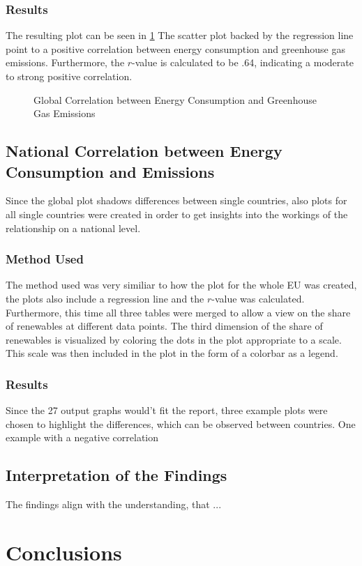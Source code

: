 \documentclass{article}
\begin{document}
\subsubsection*{Results}
The resulting plot can be seen in \cref{plt:global_consumption_vs_emissions}
The scatter plot backed by the regression line point to a positive correlation between energy consumption and greenhouse gas emissions.
Furthermore, the $r$-value is calculated to be .64, indicating a moderate to strong positive correlation.

\begin{figure}
    \centering
    \resizebox{\textwidth}{!}{}
    \caption{Global Correlation between Energy Consumption and Greenhouse Gas Emissions}
    \label{plt:global_consumption_vs_emissions}
\end{figure}

\subsection*{National Correlation between Energy Consumption and Emissions}
Since the global plot shadows differences between single countries, also plots for all single countries were created in order to get
insights into the workings of the relationship on a national level.

\subsubsection*{Method Used}
The method used was very similiar to how the plot for the whole EU was created, the plots also include a regression line and the $r$-value
was calculated.
Furthermore, this time all three tables were merged to allow a view on the share of renewables at different data points.
The third dimension of the share of renewables is visualized by coloring the dots in the plot appropriate to a scale.
This scale was then included in the plot in the form of a colorbar as a legend.

\subsubsection*{Results}
Since the 27 output graphs would't fit the report, three example plots were chosen to highlight the differences, which can be observed between countries.
One example with a negative correlation

\subsection*{Interpretation of the Findings}
The findings align with the understanding, that ...

\section*{Conclusions}
\end{document}
